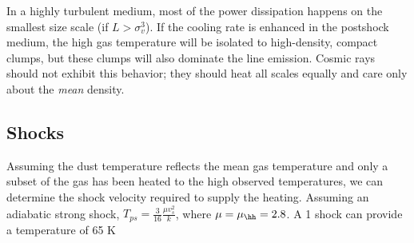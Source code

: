 
  In a highly turbulent medium, most of the power
dissipation happens on the smallest size scale (if $L > \sigma_v^3$).  If the
cooling rate is enhanced in the postshock medium, the high gas temperature will
be isolated to high-density, compact clumps, but these clumps will also
dominate the line emission.  
Cosmic rays should not exhibit this behavior; they should heat all scales equally
and care only about the \emph{mean} density.

\subsection{Shocks}
Assuming the dust temperature reflects the mean gas temperature and only a subset
of the gas has been heated to the high observed temperatures, we can determine the
shock velocity required to supply the heating.  Assuming an adiabatic strong shock,
$T_{ps} = \frac{3}{16}\frac{\mu v_s^2}{k}$, where $\mu = \mu_{\hh} = 2.8$.  A 1 \kms
shock can provide a temperature of 65 K

